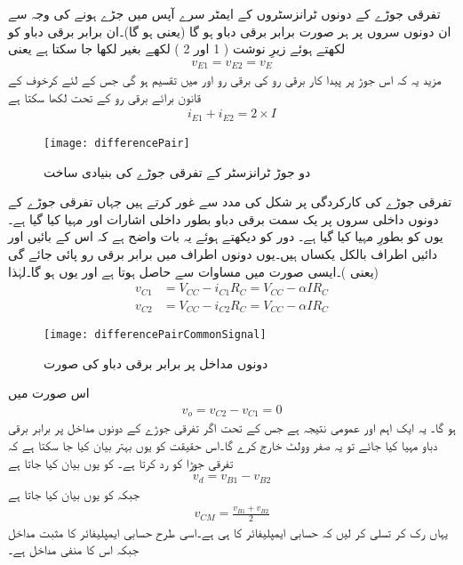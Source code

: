 تفرقی جوڑے کے دونوں ٹرانزسٹروں کے ایمٹر سرے آپس میں جڑے ہونے کی وجہ سے ان دونوں سروں پر ہر صورت برابر برقی دباو ہو گا (یعنی  ہو گا)۔ان برابر برقی دباو کو لکھتے ہوئے  زیرِ نوشت ( 1 اور 2 ) لکھے بغیر  لکھا جا سکتا ہے یعنی
\begin{align}
v_{E1}=v_{E2}=v_E
\end{align}
مزید یہ کہ اس جوڑ پر پیدا  کار برقی رو کی برقی رو   اور  میں تقسیم ہو گی جس کے لئے کرخوف کے قانون برائے برقی رو کے تحت لکھا سکتا ہے
\begin{align} \label{مساوات_تفرقی_کل_رو_قطعی}
i_{E1}+i_{E2}=2 \times I
\end{align}
%
\begin{figure}
\centering
\texttt{[image: differencePair]}
\caption{دو جوڑ ٹرانزسٹر کے تفرقی جوڑے کی بنیادی ساخت}
\label{شکل_تفرقی_جوڑے_کی_بنیادی_ساخت}
\end{figure}
%
تفرقی جوڑے کی کارکردگی پر شکل  کی مدد سے غور کرتے ہیں جہاں تفرقی جوڑے کے دونوں داخلی سروں پر یک سمت برقی دباو    بطور داخلی اشارات  اور   مہیا کیا گیا ہے۔یوں  کو بطورِ   مہیا کیا گیا ہے۔ دور کو دیکھتے ہوئے یہ بات واضح ہے کہ اس کے بائیں اور دائیں اطراف بالکل یکساں ہیں۔یوں دونوں اطراف میں برابر برقی رو پائی جائے گی (یعنی )۔ایسی صورت میں مساوات   سے    حاصل ہوتا ہے اور یوں  ہو گا۔لہٰذا
\begin{align*}
v_{C1}&=V_{CC}-i_{C1} R_C=V_{CC}-\alpha I R_C\\
v_{C2}&=V_{CC}-i_{C2}R_C=V_{CC}-\alpha I R_C
\end{align*}
%
\begin{figure}
\centering
\texttt{[image: differencePairCommonSignal]}
\caption{ دونوں مداخل پر برابر برقی دباو کی صورت}
\label{شکل_دونوں_مداخل_پر_برابر_برقی_دباو}
\end{figure}
اس صورت میں
\begin{align}
v_o=v_{C2}-v_{C1}=0
\end{align}
ہو گا۔ یہ ایک اہم اور عمومی نتیجہ ہے جس کے تحت اگر تفرقی جوڑے کے دونوں مداخل پر برابر برقی دباو مہیا کیا جائے تو یہ صفر وولٹ خارج کرے گا۔اس حقیقت کو یوں بہتر بیان کیا جا سکتا ہے کہ تفرقی جوڑا  کو رد کرتا ہے۔   کو یوں بیان کیا جاتا ہے
\begin{align}
v_d=v_{B1}-v_{B2}
\end{align}
جبکہ   کو یوں بیان کیا جاتا ہے
\begin{align}
v_{CM}=\frac{v_{B1}+v_{B2}}{2}
\end{align}
یہاں رک کر تسلی کر لیں کہ  حسابی ایمپلیفائر کا  ہی ہے۔اسی طرح   حسابی ایمپلیفائر کا مثبت مداخل جبکہ   اس کا منفی  مداخل ہے۔

